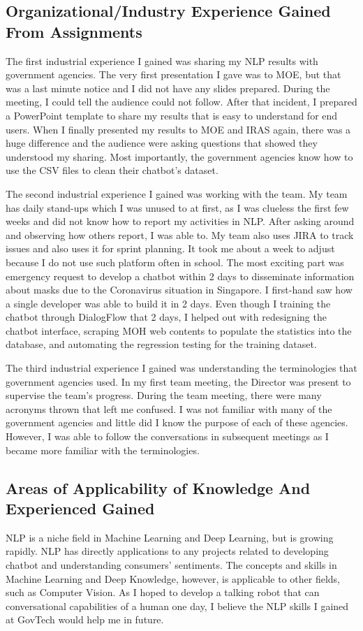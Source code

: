 \subsection{Organizational/Industry Experience Gained From Assignments}
\noindent
The first industrial experience I gained was sharing my NLP results with government agencies. The very first presentation I gave was to MOE, but that was a last minute notice and I did not have any slides prepared. During the meeting, I could tell the audience could not follow. After that incident, I prepared a PowerPoint template to share my results that is easy to understand for end users. When I finally presented my results to MOE and IRAS again, there was a huge difference and the audience were asking questions that showed they understood my sharing. Most importantly, the government agencies know how to use the CSV files to clean their chatbot's dataset. 

\noindent 
The second industrial experience I gained was working with the team. My team has daily stand-ups which I was unused to at first, as I was clueless the first few weeks and did not know how to report my activities in NLP. After asking around and observing how others report, I was able to. My team also uses JIRA to track issues and also uses it for sprint planning. It took me about a week to adjust because I do not use such platform often in school. The most exciting part was emergency request to develop a chatbot within 2 days to disseminate information about masks due to the Coronavirus situation in Singapore. I first-hand saw how a single developer was able to build it in 2 days. Even though I training the chatbot through DialogFlow that 2 days, I helped out with redesigning the chatbot interface, scraping MOH web contents to populate the statistics into the database, and automating the regression testing for the training dataset.

\noindent
The third industrial experience I gained was understanding the terminologies that government agencies used. In my first team meeting, the Director was present to supervise the team's progress. During the team meeting, there were many acronyms thrown that left me confused. I was not familiar with many of the government agencies and little did I know the purpose of each of these agencies. However, I was able to follow the conversations in subsequent meetings as I became more familiar with the terminologies.


\subsection{Areas of Applicability of Knowledge And Experienced Gained}
\noindent
NLP is a niche field in Machine Learning and Deep Learning, but is growing rapidly. NLP has directly applications to any projects related to developing chatbot and understanding consumers' sentiments. The concepts and skills in Machine Learning and Deep Knowledge, however, is applicable to other fields, such as Computer Vision. As I hoped to develop a talking robot that can conversational capabilities of a human one day, I believe the NLP skills I gained at GovTech would help me in future.
